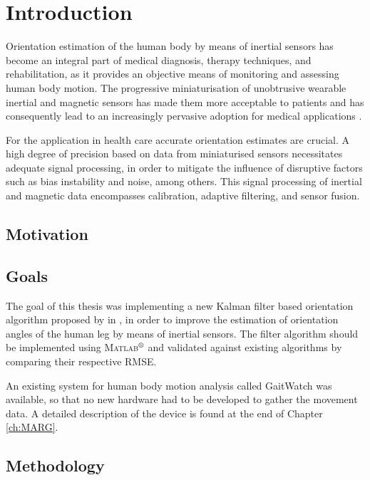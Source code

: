 \chapter{Introduction}
\label{ch:Introduction}

Orientation estimation of the human body by means of inertial sensors has become an integral part of medical diagnosis, therapy techniques, and rehabilitation, as it provides an objective means of monitoring and assessing human body motion. The progressive miniaturisation of unobtrusive wearable inertial and magnetic sensors has made them more acceptable to patients and has consequently lead to an increasingly pervasive adoption for medical applications \cite{wee_soon_ambulatory_2008}.

For the application in health care accurate orientation estimates are crucial. A high degree of precision based on data from miniaturised sensors necessitates adequate signal processing, in order to mitigate the influence of disruptive factors such as bias instability and noise, among others. This signal processing of inertial and magnetic data encompasses calibration, adaptive filtering, and sensor fusion.

\section{Motivation}


\section{Goals}

The goal of this thesis was implementing a new Kalman filter based orientation algorithm proposed by \citeauthor{bennett_motion_2014} in \cite{bennett_motion_2014}, in order to improve the estimation of orientation angles of the human leg by means of inertial sensors. The filter algorithm should be implemented using \textsc{Matlab}$\textsuperscript{\textregistered}$ and validated against existing algorithms by comparing their respective \gls{RMSE}.

An existing system for human body motion analysis called GaitWatch was available, so that no new hardware had to be developed to gather the movement data. A detailed description of the device is found at the end of Chapter \ref{ch:MARG}. 

\section{Methodology}

